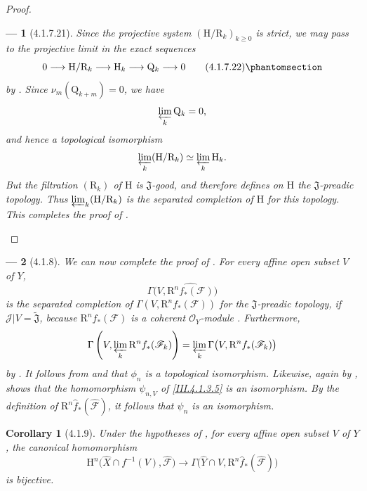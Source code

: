 \documentclass[oneside]{amsart}
\theoremstyle{ega-env-style}
\newtheorem*{env}{---}
\theoremstyle{ega-thm-env-style}
\newtheorem*{corollary}{Corollary}
\theoremstyle{ega-defn-env-style}
\def\mathcal{\mathscr}
\def\sh{\mathcal}                   %
\def\geq{\geqslant}                 %
\def\vphi{\phi}                     %
\def\HH{\mathrm{H}}                 %
\def\RR{\mathrm{R}}                 %
\def\isoto{\simeq} %
\let\EGAOriginalLabel\label
\renewcommand{\label}[1]{\phantomsection\EGAOriginalLabel{#1}}
\begin{document}
\begin{proof}
\begin{env}[4.1.7.21]
Since the projective system
$(\mathrm{H}/\mathrm{R}_k)_{k\geq0}$ is strict, we may pass to the
projective limit in the exact sequences
\[
  0
  \longrightarrow
  \mathrm{H}/\mathrm{R}_k
  \longrightarrow
  \mathrm{H}_k
  \longrightarrow
  \mathrm{Q}_k
  \longrightarrow
  0
  \tag{4.1.7.22}
  \label{III.4.1.7.22}
\]
by .
Since $\nu_m(\mathrm{Q}_{k+m})=0$, we have
\[
  \varprojlim_k\mathrm{Q}_k=0,
\]
and hence a topological isomorphism
\[
  \varprojlim_k(\mathrm{H}/\mathrm{R}_k)
  \isoto
  \varprojlim_k\mathrm{H}_k.
\]
But the filtration $(\mathrm{R}_k)$ of $\mathrm{H}$ is
$\mathfrak{J}$-good, and therefore defines on $\mathrm{H}$ the
$\mathfrak{J}$-preadic topology.
Thus $\varprojlim_k(\mathrm{H}/\mathrm{R}_k)$ is the separated
completion of $\mathrm{H}$ for this topology.
This completes the proof of .
\end{env}
\end{proof}

\begin{env}[4.1.8]
\label{III.4.1.8}
We can now complete the proof of .
For every affine open subset $V$ of $Y$,
\[
  \Gamma\bigl(
    V,\widehat{\RR^n f_*(\sh{F})}
  \bigr)
\]
is the separated completion of
$\Gamma(V,\RR^n f_*(\sh{F}))$ for the
$\mathfrak{J}$-preadic topology, if
$\sh{J}|V=\widetilde{\mathfrak{J}}$, because
$\RR^n f_*(\sh{F})$ is a coherent $\sh{O}_Y$-module
.
Furthermore,
\[
  \Gamma\left(
    V,\varprojlim_k\RR^n f_*(\sh{F}_k)
  \right)
  =
  \varprojlim_k
  \Gamma\bigl(V,\RR^n f_*(\sh{F}_k)\bigr)
\]
by .
It follows from  and  that
$\vphi_n$ is a topological isomorphism.
Likewise, again by ,  shows that the
homomorphism $\psi_{n,V}$ of \eqref{III.4.1.3.5} is an isomorphism.
By the definition of
$\RR^n\widehat{f}_*(\widehat{\sh{F}})$, it follows that $\psi_n$ is
an isomorphism.
\end{env}

\begin{corollary}[4.1.9]
\label{III.4.1.9}
Under the hypotheses of , for every affine open
subset $V$ of $Y$, the canonical homomorphism
\[
  \HH^n\bigl(
    \widehat{X}\cap f^{-1}(V),
    \widehat{\sh{F}}
  \bigr)
  \longrightarrow
  \Gamma\bigl(
    \widehat{Y}\cap V,
    \RR^n\widehat{f}_*(\widehat{\sh{F}})
  \bigr)
\]
is bijective.
\end{corollary}
\end{document}
